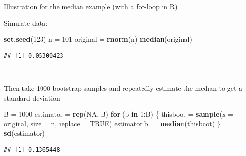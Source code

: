 \documentclass[
  10pt,
  ignorenonframetext,
]{beamer}
\newenvironment{Shaded}{\begin{snugshade}}{\end{snugshade}}
\newcommand{\AttributeTok}[1]{\textcolor[rgb]{0.13,0.29,0.53}{#1}}
\newcommand{\ConstantTok}[1]{\textcolor[rgb]{0.56,0.35,0.01}{#1}}
\newcommand{\ControlFlowTok}[1]{\textcolor[rgb]{0.13,0.29,0.53}{\textbf{#1}}}
\newcommand{\DecValTok}[1]{\textcolor[rgb]{0.00,0.00,0.81}{#1}}
\newcommand{\FunctionTok}[1]{\textcolor[rgb]{0.13,0.29,0.53}{\textbf{#1}}}
\newcommand{\NormalTok}[1]{#1}
\newcommand{\OtherTok}[1]{\textcolor[rgb]{0.56,0.35,0.01}{#1}}
\newcommand{\SpecialCharTok}[1]{\textcolor[rgb]{0.81,0.36,0.00}{\textbf{#1}}}
\begin{document}
\begin{frame}[fragile]
\begin{block}{Illustration for the median example (with a for-loop in
R)}
\protect\hypertarget{illustration-for-the-median-example-with-a-for-loop-in-r}{}
\(~\)

Simulate data:

\vspace{2mm}

\scriptsize

\begin{Shaded}
\begin{Highlighting}[]
\FunctionTok{set.seed}\NormalTok{(}\DecValTok{123}\NormalTok{)}
\NormalTok{n }\OtherTok{=} \DecValTok{101}
\NormalTok{original }\OtherTok{=} \FunctionTok{rnorm}\NormalTok{(n)}
\FunctionTok{median}\NormalTok{(original)}
\end{Highlighting}
\end{Shaded}

\begin{verbatim}
## [1] 0.05300423
\end{verbatim}

\(~\)

\normalsize

Then take 1000 bootstrap samples and repeatedly estimate the median to
get a standard deviation:

\vspace{2mm}

\scriptsize

\begin{Shaded}
\begin{Highlighting}[]
\NormalTok{B }\OtherTok{=} \DecValTok{1000}
\NormalTok{estimator }\OtherTok{=} \FunctionTok{rep}\NormalTok{(}\ConstantTok{NA}\NormalTok{, B)}
\ControlFlowTok{for}\NormalTok{ (b }\ControlFlowTok{in} \DecValTok{1}\SpecialCharTok{:}\NormalTok{B) \{}
\NormalTok{    thisboot }\OtherTok{=} \FunctionTok{sample}\NormalTok{(}\AttributeTok{x =}\NormalTok{ original, }\AttributeTok{size =}\NormalTok{ n, }\AttributeTok{replace =} \ConstantTok{TRUE}\NormalTok{)}
\NormalTok{    estimator[b] }\OtherTok{=} \FunctionTok{median}\NormalTok{(thisboot)}
\NormalTok{\}}
\FunctionTok{sd}\NormalTok{(estimator)}
\end{Highlighting}
\end{Shaded}

\begin{verbatim}
## [1] 0.1365448
\end{verbatim}
\end{block}
\end{frame}
\end{document}
